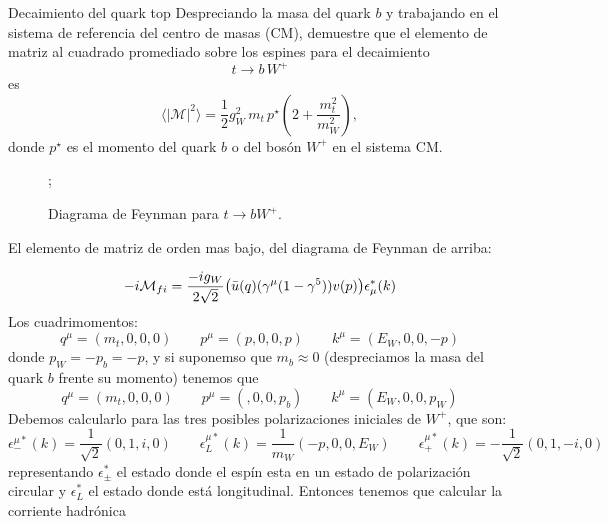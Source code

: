\begin{Ejercicio}{Decaimiento del quark top}\label{Ej:22}
Despreciando la masa del quark $b$ y trabajando en el sistema de referencia del centro de masas (CM),
demuestre que el elemento de matriz al cuadrado promediado sobre los espines para el decaimiento 
\[
t \to b\, W^+
\]
es
\[
\langle |\mathcal{M}|^2 \rangle 
= \frac{1}{2} g_W^2\, m_t\, p^{\star}
\left( 2 + \frac{m_t^2}{m_W^2} \right),
\]
donde $p^{\star}$ es el momento del quark $b$ o del bosón $W^+$ en el sistema CM.
\end{Ejercicio}


\begin{figure}[H]
	\centering
	;
	\caption{Diagrama de Feynman para \(t \to bW^+\).}
\end{figure}
El elemento de matriz de orden mas bajo, del diagrama de Feynman de arriba:

\begin{equation}
	-i\Mcal_{fi} = \frac{-ig_W}{2\sqrt{2}} \pqty{ \bar{u}(q) (\gamma^\mu  (1-\gamma^5))v(p)} \epsilon_\mu^* (k)
\end{equation}
Los cuadrimomentos: 
\begin{equation}
	q^\mu = (m_t,0,0,0) \qquad p^\mu = (p, 0,0,p)  \qquad k^\mu = (E_W, 0,0,-p)
\end{equation}
donde $p_W=-p_b=-p$, y si suponemso que $m_b\approx 0$ (despreciamos la masa del quark $b$ frente su momento) tenemos que
\begin{equation}
	q^\mu = (m_t,0,0,0) \qquad p^\mu = (, 0,0,p_b)  \qquad k^\mu = (E_W, 0,0,p_W)
\end{equation}
Debemos calcularlo para las tres posibles polarizaciones iniciales de $W^+$, que son: 
\begin{equation}
	\epsilon_-^{\mu*} (k) = \frac{1}{\sqrt{2}} (0,1,i,0) \qquad \epsilon_L^{\mu*} (k)= \frac{1}{m_W} (-p,0,0,E_W) \qquad \epsilon_+^{\mu*} (k) = - \frac{1}{\sqrt{2}} (0,1,-i,0)
\end{equation}
representando $\epsilon_\pm^*$ el estado donde el espín esta en un estado de polarización circular y $\epsilon_L^*$ el estado donde está longitudinal.
Entonces tenemos que calcular la corriente hadrónica 

